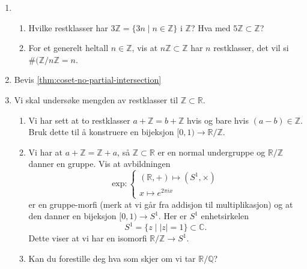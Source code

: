 \begin{enumerate}
    \item
        \begin{enumerate}
            \item Hvilke restklasser har $3\mathbb Z = \{3n \mid n\in \mathbb Z\}$
                i $\mathbb Z$? Hva med $5\mathbb Z\subset \mathbb Z$?
            \item For et generelt heltall $n\in \mathbb Z$,
                vis at $n\mathbb Z\subset \mathbb Z$ har $n$ restklasser,
                det vil si $\#(\mathbb Z / n\mathbb Z = n$.
        \end{enumerate}
    \item Bevis \cref{thm:coset-no-partial-intersection}
    \item Vi skal undersøke mengden av restklasser til $\mathbb Z\subset \mathbb R$.
        \begin{enumerate}
            \item Vi har sett at to restklasser $a + \mathbb Z = b + \mathbb Z$
                hvis og bare hvis $(a - b)\in \mathbb Z$.
                Bruk dette til å konstruere en bijeksjon
                $[0,1)\to \mathbb R / \mathbb Z$.
            \item Vi har at $a + \mathbb Z = \mathbb Z + a$,
                så $\mathbb Z\subset \mathbb R$ er en normal undergruppe
                og $\mathbb R / \mathbb Z$ danner en gruppe.
                Vis at avbildningen
                \[
                    \mathrm{exp}\colon \begin{cases}
                        (\mathbb R, +)\mapsto (S^1,\times)\\
                        x\mapsto e^{2\pi i x}
                    \end{cases}
                \]
                er en gruppe-morfi (merk at vi går fra addisjon til multiplikasjon)
                og at den danner en bijeksjon $[0,1)\to S^1$.
                Her er $S^1$ enhetsirkelen
                \[
                    S^1 = \{z\mid |z| = 1\}\subset \mathbb C.
                \]
                Dette viser at vi har en isomorfi $\mathbb R / \mathbb Z \to S^1$.
            \item Kan du forestille deg hva som skjer om vi tar
                $\mathbb R / \mathbb Q$?
        \end{enumerate}
\end{enumerate}

